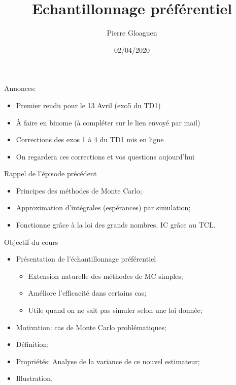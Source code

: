 \documentclass[ignorenonframetext,]{beamer}
\title{Echantillonnage préférentiel}
\author{Pierre Gloaguen}
\date{02/04/2020}
\providecommand{\tightlist}{%
  \setlength{\itemsep}{0pt}\setlength{\parskip}{0pt}}
\begin{document}
\frame{\titlepage}

\begin{frame}{Annonces:}
\protect\hypertarget{annonces}{}

\begin{itemize}
\tightlist
\item
  Premier rendu pour le 13 Avril (exo5 du TD1)
\item
  À faire en binome (à compléter sur le lien envoyé par mail)
\item
  Corrections des exos 1 à 4 du TD1 mis en ligne
\item
  On regardera ces corrections et vos questions aujourd'hui
\end{itemize}

\end{frame}

\begin{frame}{Rappel de l'épisode précédent}
\protect\hypertarget{rappel-de-luxe9pisode-pruxe9cuxe9dent}{}

\begin{itemize}
\tightlist
\item
  Principes des méthodes de Monte Carlo;
\item
  Approximation d'intégrales (espérances) par simulation;
\item
  Fonctionne grâce à la loi des grands nombres, IC grâce au TCL.
\end{itemize}

\end{frame}

\begin{frame}{Objectif du cours}
\protect\hypertarget{objectif-du-cours}{}

\begin{itemize}
\tightlist
\item
  Présentation de l'échantillonnage préférentiel

  \begin{itemize}
  \tightlist
  \item
    Extension naturelle des méthodes de MC simples;
  \item
    Améliore l'efficacité dans certains cas;
  \item
    Utile quand on ne sait pas simuler selon une loi donnée;\pause
  \end{itemize}
\item
  Motivation: cas de Monte Carlo problématiques;
\item
  Définition;
\item
  Propriétés: Analyse de la variance de ce nouvel estimateur;
\item
  Illustration.
\end{itemize}

\end{frame}
\end{document}
